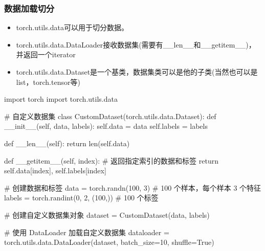     \subsubsection{数据加载切分}
      \begin{itemize}
        \item torch.utils.data可以用于切分数据。
        \item torch.utils.data.DataLoader接收数据集(需要有\_\_len\_\_和\_\_getitem\_\_)，并返回一个iterator
        \item torch.utils.data.Dataset是一个基类，数据集类可以是他的子类(当然也可以是list，torch.tensor等)
      \end{itemize}
      \begin{codeblock}[language=python, caption={DataLoader}]
        import torch
        import torch.utils.data

        # 自定义数据集
        class CustomDataset(torch.utils.data.Dataset):
            def __init__(self, data, labels):
                self.data = data
                self.labels = labels

            def __len__(self):
                return len(self.data)

            def __getitem__(self, index):
                # 返回指定索引的数据和标签
                return self.data[index], self.labels[index]

        # 创建数据和标签
        data = torch.randn(100, 3)  # 100 个样本，每个样本 3 个特征
        labels = torch.randint(0, 2, (100,))  # 100 个标签

        # 创建自定义数据集对象
        dataset = CustomDataset(data, labels)

        # 使用 DataLoader 加载自定义数据集
        dataloader = torch.utils.data.DataLoader(dataset, batch_size=10, shuffle=True)
      \end{codeblock}
